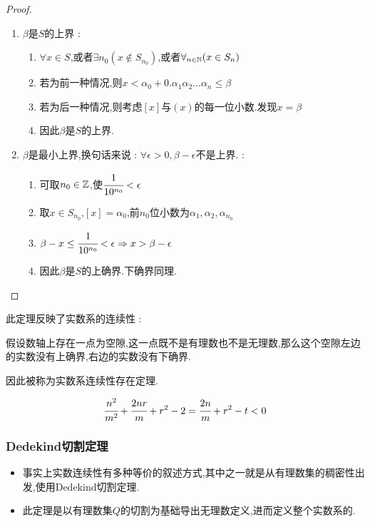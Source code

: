 {{{{\begin{enumerate}
{\begin{proof}
              \begin{enumerate}
                  \item $\beta$是$S$的上界 : \begin{enumerate}
                            \item $\forall x \in S$,或者$\exists n_0(x \notin S_{n_0})$,或者$\forall_{n \in \operatorname{\mathbb{N}}}(x \in S_n)$
                            \item 若为前一种情况,则$x < \alpha_0 + 0.\alpha_1\alpha_2 \dots \alpha_n \leq \beta$
                            \item 若为后一种情况,则考虑$[x]$与$(x)$的每一位小数.发现$x = \beta$
                            \item 因此$\beta$是$S$的上界.
                        \end{enumerate}
                  \item $\beta$是最小上界,换句话来说 : $\forall \epsilon > 0,\beta - \epsilon$不是上界. : \begin{enumerate}
                            \item 可取$n_0 \in \operatorname{\mathbb{Z}}$,使$\cfrac{1}{10^{n_0}} < \epsilon$
                            \item 取$x \in S_{n_0}$,$[x] = \alpha_0$,前$n_0$位小数为$\alpha_1,\alpha_2,\alpha_{n_0}$
                            \item $\beta - x \leq \cfrac{1}{10^{n_0}} < \epsilon \Rightarrow x > \beta - \epsilon$
                            \item 因此$\beta$是$S$的上确界.下确界同理.
                        \end{enumerate}
              \end{enumerate}
          \end{proof}
          }
\end{enumerate}

此定理反映了实数系的连续性 :

假设数轴上存在一点为空隙,这一点既不是有理数也不是无理数,那么这个空隙左边的实数没有上确界,右边的实数没有下确界.

因此被称为实数系连续性存在定理.

$$
    \cfrac{n^2}{m^2} + \cfrac{2nr}{m} + r^2 - 2 = \cfrac{2n}{m} + r^2 - t < 0
$$
}%

\subsubsection{Dedekind切割定理}{
    \begin{itemize}
        \item 事实上实数连续性有多种等价的叙述方式,其中之一就是从有理数集的稠密性出发,使用Dedekind切割定理.
        \item 此定理是以有理数集$Q$的切割为基础导出无理数定义,进而定义整个实数系的.
    \end{itemize}

}}}}
